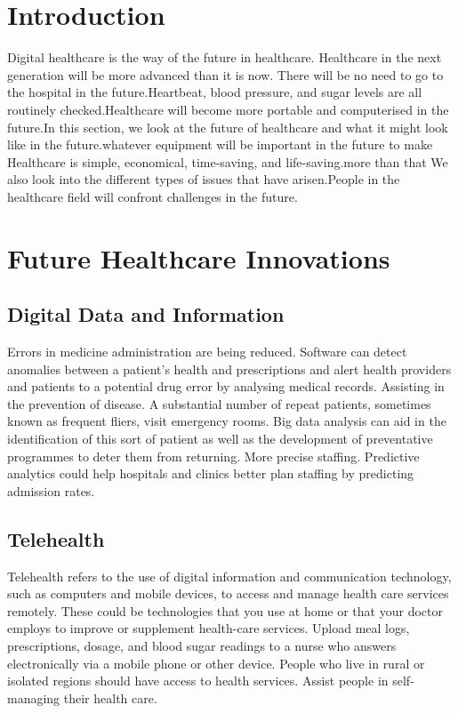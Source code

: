 \documentclass[12 pt]{article}
\begin{document}
\section{Introduction}
Digital healthcare is the way of the future in healthcare. Healthcare in the next generation will be more advanced than it is now. There will be no need to go to the hospital in the future.Heartbeat, blood pressure, and sugar levels are all routinely checked.Healthcare will become more portable and computerised in the future.In this section, we look at the future of healthcare and what it might look like in the future.whatever equipment will be important in the future to make
Healthcare is simple, economical, time-saving, and life-saving.more than that We also look into the different types of issues that have arisen.People in the healthcare field will confront challenges in the future.


\section{Future Healthcare Innovations}


\subsection{Digital Data and Information}
Errors in medicine administration are being reduced. Software can detect anomalies between a patient's health and prescriptions and alert health providers and patients to a potential drug error by analysing medical records.
Assisting in the prevention of disease. A substantial number of repeat patients, sometimes known as frequent fliers, visit emergency rooms. Big data analysis can aid in the identification of this sort of patient as well as the development of preventative programmes to deter them from returning.
More precise staffing. Predictive analytics could help hospitals and clinics better plan staffing by predicting admission rates.

\subsection{Telehealth}

Telehealth refers to the use of digital information and communication technology, such as computers and mobile devices, to access and manage health care services remotely. These could be technologies that you use at home or that your doctor employs to improve or supplement health-care services. Upload meal logs, prescriptions, dosage, and blood sugar readings to a nurse who answers electronically via a mobile phone or other device. People who live in rural or isolated regions should have access to health services. Assist people in self-managing their health care.
\end{document}
